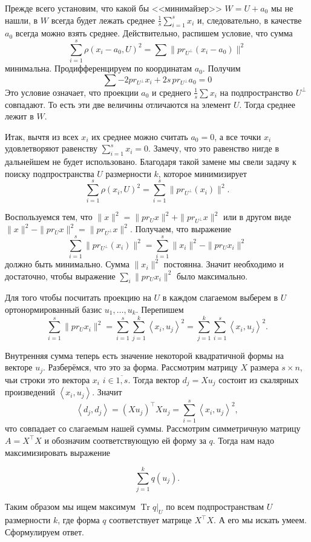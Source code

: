 \documentclass[12pt,a4paper,oneside]{book}
\theoremstyle{definition}
\newcommand{\ovl}{\overline}
\newcommand{\Tr}{\operatorname{Tr}}
\def\lan{\left\langle }
\def\ran{\right\rangle}
\begin{document}
Прежде всего установим, что какой бы <<минимайзер>> $W=U+a_0$ мы не нашли, в $W$ всегда будет лежать среднее $\frac{1}{s}\sum_{i=1}^s x_i$ и, следовательно, в качестве $a_0$ всегда можно взять среднее. Действительно, распишем условие, что сумма 
$$\sum_{i=1}^s \rho(x_i-a_0, U)^2=\sum \|pr_{U^{\bot}} (x_i-a_0)\|^2$$
минимальна.  Продифференцируем по координатам $a_0$. Получим $$\sum -2pr_{U^{\bot}} x_i + 2s \,pr_{U^{\bot}} a_0=0$$
 Это условие означает, что проекции $a_0$ и среднего $\frac{1}{s}\sum x_i$ на подпространство $U^{\bot}$ совпадают. То есть эти две величины отличаются на элемент $U$. Тогда среднее лежит в $W$. 

Итак, вычтя из всех $x_i$ их среднее можно считать $a_0=0$, а все точки $x_i$ удовлетворяют равенству $\sum_{i=1}^s x_i=0$. Замечу, что это равенство нигде в дальнейшем не будет использовано. Благодаря такой замене мы свели задачу к поиску подпространства $U$ размерности $k$, которое минимизирует 
$$\sum_{i=1}^s \rho(x_i, U)^2=\sum_{i=1}^s \|pr_{U^{\bot}} (x_i)\|^2.$$

Воспользуемся тем, что $\|x\|^2=\|pr_U x\|^2+\|pr_{U^{\bot}} x\|^2$ или в другом виде $\|x\|^2-\|pr_U x\|^2=\|pr_{U^{\bot}} x\|^2$. Получаем, что выражение
$$\sum_{i=1}^s \|pr_{U^{\bot}}(x_i)\|^2=\sum_{i=1}^s \|x_i\|^2-\|pr_U x_i\|^2$$
должно быть минимально. Сумма $\|x_i\|^2$ постоянна. Значит  необходимо и достаточно, чтобы выражение $\sum_i \|pr_U x_i\|^2$ было максимально.


Для того чтобы посчитать проекцию на $U$ в каждом слагаемом выберем в $U$ ортонормированный базис $u_1,\dots,u_k$. Перепишем
$$\sum_{i=1}^s \|pr_U x_i\|^2=\sum_{i=1}^s\sum_{j=1}^k \lan x_i,u_j\ran^2=\sum_{j=1}^k \sum_{i=1}^s \lan x_i,u_j\ran^2.$$

Внутренняя сумма теперь есть значение некоторой квадратичной формы на векторе $u_j$. Разберёмся, что это за форма. Рассмотрим матрицу $X$ размера $s\times n$, чьи строки это  вектора $x_i$ $i\in\ovl{1,s}$. Тогда вектор $d_j=Xu_j$ состоит из скалярных произведений  $\lan x_i, u_j\ran$. Значит 
$$\lan d_j,d_j\ran = (Xu_j)^{\top}Xu_j = \sum_{i=1}^s \lan x_i,u_j\ran^2,$$ 
что совпадает со слагаемым нашей суммы. Рассмотрим симметричную матрицу $A=X^{\top}X$ и обозначим соответствующую ей форму за $q$. Тогда нам надо максимизировать выражение

$$\sum_{j=1}^k q(u_j).$$

Таким образом мы ищем максимум $\Tr q|_{U}$ по всем подпространствам $U$ размерности $k$, где форма $q$ соответствует матрице $X^{\top} X$. А его мы искать умеем. Сформулируем  ответ. 
\end{document}

